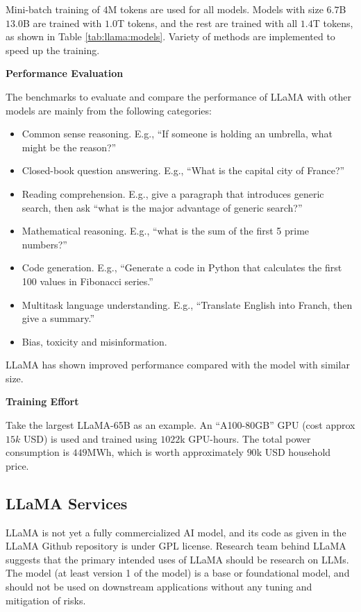 Mini-batch training of $4$M tokens are used for all models. Models with size $6.7$B $13.0$B are trained with $1.0$T tokens, and the rest are trained with all $1.4$T tokens, as shown in Table \ref{tab:llama:models}. Variety of methods are implemented to speed up the training.

\vspace{0.1in}
\noindent \textbf{Performance Evaluation}
\vspace{0.1in}

The benchmarks to evaluate and compare the performance of LLaMA with other models are mainly from the following categories:
\begin{itemize}
	\item Common sense reasoning. E.g., ``If someone is holding an umbrella, what might be the reason?''
	\item Closed-book question answering. E.g., ``What is the capital city of France?''
	\item Reading comprehension. E.g., give a paragraph that introduces generic search, then ask ``what is the major advantage of generic search?''
	\item Mathematical reasoning. E.g., ``what is the sum of the first 5 prime numbers?''
	\item Code generation. E.g., ``Generate a code in Python that calculates the first 100 values in Fibonacci series.''
	\item Multitask language understanding. E.g., ``Translate English into Franch, then give a summary.''
	\item Bias, toxicity and misinformation.
\end{itemize}

LLaMA has shown improved performance compared with the model with similar size.

\vspace{0.1in}
\noindent \textbf{Training Effort}
\vspace{0.1in}

Take the largest LLaMA-65B as an example. An ``A100-80GB'' GPU (cost approx $15k$ USD) is used and trained using $1022$k GPU-hours. The total power consumption is $449$MWh, which is worth approximately $90$k USD household price.

\subsection{LLaMA Services}

LLaMA is not yet a fully commercialized AI model, and its code as given in the LLaMA Github repository is under GPL license. Research team behind LLaMA suggests that the primary intended uses of LLaMA should be research on LLMs. The model (at least version 1 of the model) is a base or foundational model, and should not be used on downstream applications without any tuning and mitigation of risks.


